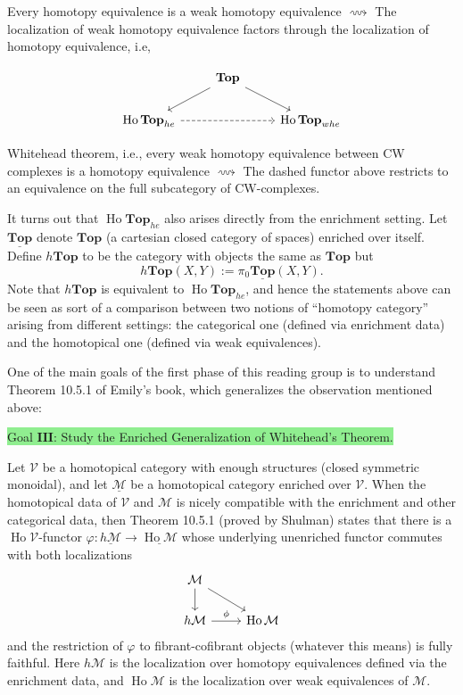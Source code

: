 \documentclass[11pt]{article}
\theoremstyle{definition}
\theoremstyle{remark}
\newcommand{\Ho}{\operatorname{Ho}}
\newcommand{\Top}{\mathbf{Top}}
\newcommand{\calM}{\mathcal{M}}
\newcommand{\calV}{\mathcal{V}}
\begin{document}
Every homotopy equivalence is a weak homotopy equivalence $\longrightsquigarrow$
The localization of weak homotopy equivalence factors through the localization of homotopy equivalence, i.e,

\[
\begin{tikzcd}
    & \Top \arrow[dl] \arrow[dr] & \\
    \Ho \Top_{he} \arrow[rr, dashed] &  & \Ho \Top_{whe}
\end{tikzcd}
\]

Whitehead theorem, i.e., every weak homotopy equivalence between CW complexes is a homotopy equivalence
$\longrightsquigarrow$
The dashed functor above restricts to an equivalence on the full subcategory of CW-complexes.

It turns out that $\Ho \Top_{he}$ also arises directly from the enrichment setting.
Let $\underline{\Top}$ denote $\Top$ (a cartesian closed category of spaces) enriched over itself.
Define $h\Top$ to be the category with objects the same as $\Top$ but
$$h\Top(X,Y) := \pi_0\underline{\Top}(X,Y).$$
Note that $h\Top$ is equivalent to $\Ho\Top_{he}$, and hence
the statements above can be seen as sort of a comparison between
two notions of ``homotopy category'' arising from different settings: the categorical one 
(defined via enrichment data) and the homotopical one (defined via weak equivalences).

One of the main goals of the first phase of this reading group is to understand Theorem 10.5.1 of Emily's book,
which generalizes the observation mentioned above:

\bigbreak

\colorbox{lightgreen}{Goal $\mathbf{III}$: Study the Enriched Generalization of Whitehead's Theorem.}

\bigbreak

Let $\calV$ be a homotopical category with enough structures (closed symmetric monoidal), and let $\underline{\calM}$
be a homotopical category enriched over $\calV$. When the homotopical data of $\calV$ and $\calM$ 
is nicely compatible with the enrichment and other categorical data, then Theorem 10.5.1 (proved by Shulman) 
states that there is a
$\Ho\calV$-functor $\varphi : \underline{h\calM} \to \underline{\Ho\calM}$  whose underlying unenriched functor commutes
with both localizations
\[
\begin{tikzcd}
    \calM \arrow[d] \arrow[dr] & \\
    h\calM \arrow[r, "\phi"] & \Ho\calM
\end{tikzcd}
\]
and the restriction of $\varphi$ to fibrant-cofibrant objects (whatever this means)
is fully faithful. Here $h\calM$ is the localization over homotopy equivalences 
defined via the enrichment data, and $\Ho\calM$ is the localization over weak equivalences of $\calM$.
\end{document}
